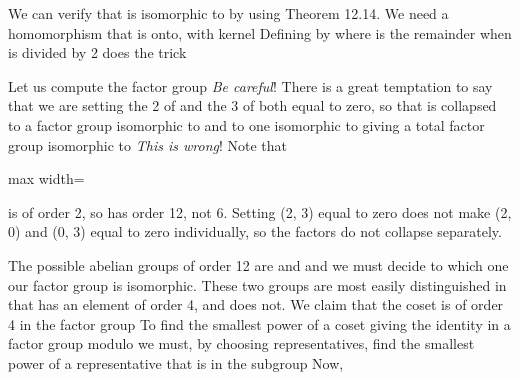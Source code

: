 \documentclass[11pt,oneside]{article}
\begin{document}
\begin{BookBody}
We can verify that  is isomorphic to  by using Theorem 12.14. We need a homomorphism  that is onto, with kernel  Defining \BookInline{\phi } by  where  is the remainder when  is divided by 2 does the trick\BookEnd{\blacktriangle}

 Let us compute the factor group  \textit{Be careful}! There is a great temptation to say that we are setting the 2 of  and the 3 of  both equal to zero, so that  is collapsed to a factor group isomorphic to  and  to one isomorphic to  giving a total factor group isomorphic to  \textit{This is wrong}! Note that

\begin{center}\begin{adjustbox}{max width=\linewidth}\end{adjustbox}\end{center}

\noindent is of order 2, so  has order 12, not 6. Setting (2, 3) equal to zero does not make (2, 0) and (0, 3) equal to zero individually, so the factors do not collapse separately.

The possible abelian groups of order 12 are  and  and we must decide to which one our factor group is isomorphic. These two groups are most easily distinguished in that  has an element of order 4, and  does not. We claim that the coset  is of order 4 in the factor group  To find the smallest power of a coset giving the identity in a factor group modulo  we must, by choosing representatives, find the smallest power of a representative that is in the subgroup  Now,


\end{BookBody}
\end{document}
